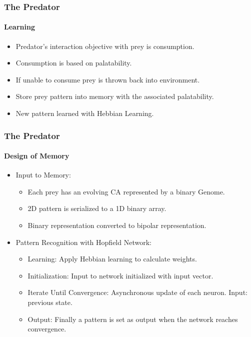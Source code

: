 \frame
{
	\frametitle{The Predator}
	\framesubtitle{Learning}

	\begin{itemize}
		\item Predator's interaction objective with prey is consumption.
		\item Consumption is based on palatability.
		\item If unable to consume prey is thrown back into environment.
		\item Store prey pattern into memory with the associated palatability.
		\item New pattern learned with Hebbian Learning.
	\end{itemize}
}

\frame
{
	\frametitle{The Predator}
	\framesubtitle{Design of Memory}
	
	\begin{itemize}
		\item Input to Memory:
			\begin{itemize}
				\item Each prey has an evolving CA represented by a binary Genome.
				\item 2D pattern is serialized to a 1D binary array.
				\item Binary representation converted to bipolar representation.
			\end{itemize}
		\item Pattern Recognition with Hopfield Network:
			\begin{itemize}
				\item Learning: Apply Hebbian learning to calculate weights.
				\item Initialization: Input to network initialized with input vector.
				\item Iterate Until Convergence: Asynchronous update of each neuron. Input: previous state.
				\item Output: Finally a pattern is set as output when the network reaches convergence.
			\end{itemize}
	\end{itemize}
}

